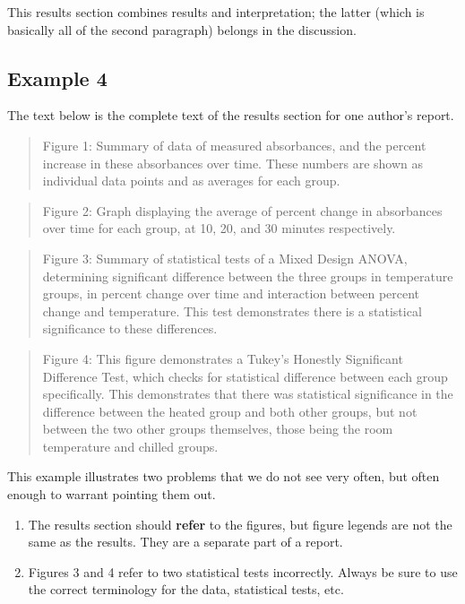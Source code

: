 \documentclass[
]{book}
\providecommand{\tightlist}{%
  \setlength{\itemsep}{0pt}\setlength{\parskip}{0pt}}
\begin{document}
This results section combines results and interpretation; the latter (which is basically all of the second paragraph) belongs in the discussion.

\hypertarget{example-4-1}{%
\subsection{Example 4}\label{example-4-1}}

The text below is the complete text of the results section for one author's report.

\begin{quote}
Figure 1: Summary of data of measured absorbances, and the percent increase in these absorbances over time. These numbers are shown as individual data points and as averages for each group.
\end{quote}

\begin{quote}
Figure 2: Graph displaying the average of percent change in absorbances over time for each group, at 10, 20, and 30 minutes respectively.
\end{quote}

\begin{quote}
Figure 3: Summary of statistical tests of a Mixed Design ANOVA, determining significant difference between the three groups in temperature groups, in percent change over time and interaction between percent change and temperature. This test demonstrates there is a statistical significance to these differences.
\end{quote}

\begin{quote}
Figure 4: This figure demonstrates a Tukey's Honestly Significant Difference Test, which checks for statistical difference between each group specifically. This demonstrates that there was statistical significance in the difference between the heated group and both other groups, but not between the two other groups themselves, those being the room temperature and chilled groups.
\end{quote}

This example illustrates two problems that we do not see very often, but often enough to warrant pointing them out.

\begin{enumerate}
\def\labelenumi{\arabic{enumi}.}
\tightlist
\item
  The results section should \textbf{refer} to the figures, but figure legends are not the same as the results. They are a separate part of a report.
\item
  Figures 3 and 4 refer to two statistical tests incorrectly. Always be sure to use the correct terminology for the data, statistical tests, etc.
\end{enumerate}
\end{document}
